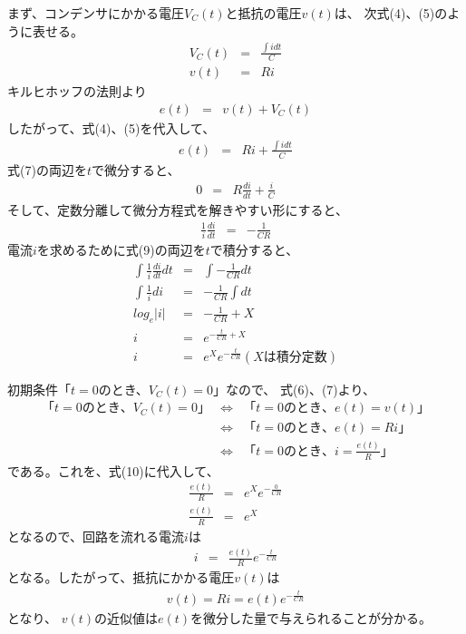 \documentclass[12pt]{jarticle}
\begin{document}
まず、コンデンサにかかる電圧$V_C(t)$と抵抗の電圧$v(t)$は、
次式(4)、(5)のように表せる。
\begin{eqnarray}
    V_C(t)&=&\frac{\int idt}{C}\\
    v(t)&=&Ri
\end{eqnarray}
キルヒホッフの法則より
\begin{eqnarray}
    e(t)&=&v(t)+V_C(t)
\end{eqnarray}
したがって、式(4)、(5)を代入して、
\begin{eqnarray}
    e(t)&=&Ri+\frac{\int idt}{C}
\end{eqnarray}
式(7)の両辺を$t$で微分すると、
\begin{eqnarray}
    0&=&R\frac{di}{dt}+\frac{i}{C}
\end{eqnarray}
そして、定数分離して微分方程式を解きやすい形にすると、
\begin{eqnarray}
    \frac{1}{i}\frac{di}{dt}&=&-\frac{1}{CR}
\end{eqnarray}
電流$i$を求めるために式(9)の両辺を$t$で積分すると、
\begin{eqnarray}
    \int \frac{1}{i} \frac{di}{dt}dt&=&\int-\frac{1}{CR}dt \nonumber\\
    \int \frac{1}{i}di&=&-\frac{1}{CR}\int dt \nonumber\\
    log_e|i|&=&-\frac{1}{CR}+X \nonumber\\
    i&=&e^{-\frac{t}{CR}+X} \nonumber\\
    i&=&e^Xe^{-\frac{t}{CR}}(Xは積分定数)
\end{eqnarray}
\clearpage

初期条件「$t=0$のとき、$V_C(t)=0$」なので、
式(6)、(7)より、
\begin{eqnarray}
    「t=0のとき、V_C(t)=0」&\Leftrightarrow& 「t=0のとき、e(t)=v(t)」\nonumber\\
    &\Leftrightarrow&「t=0のとき、e(t)=Ri」\nonumber\\
    &\Leftrightarrow&「t=0のとき、i=\frac{e(t)}{R}」
\end{eqnarray}
である。これを、式(10)に代入して、
\begin{eqnarray}
    \frac{e(t)}{R}&=&e^Xe^{-\frac{0}{CR}}\nonumber\\
    \frac{e(t)}{R}&=&e^X
\end{eqnarray}
となるので、回路を流れる電流$i$は
\begin{eqnarray}
    i&=& \frac{e(t)}{R}e^{-\frac{t}{CR}}
\end{eqnarray}
となる。したがって、抵抗にかかる電圧$v(t)$は
\begin{eqnarray}
    v(t)=Ri=e(t)e^{-\frac{t}{CR}}
\end{eqnarray}
となり、 $v(t)$の近似値は$e(t)$を微分した量で与えられることが分かる。
\end{document}
